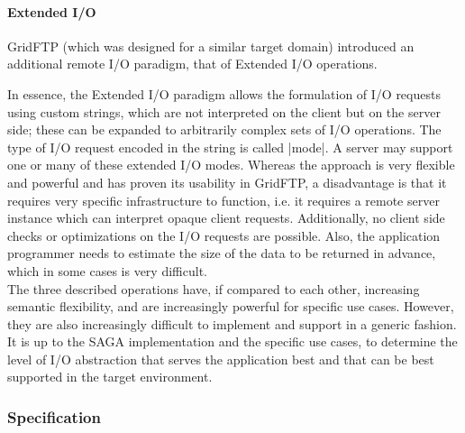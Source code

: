  
   \paragraph{Extended I/O}
   
   GridFTP (which was designed for a similar target domain)
   introduced an additional remote I/O paradigm, that of
   Extended I/O operations.
   
   In essence, the Extended I/O paradigm allows the formulation
   of I/O requests using custom strings, which are not
   interpreted on the client but on the server side; these can
   be expanded to arbitrarily complex sets of I/O
   operations.  The type of I/O request encoded in the string is
   called |mode|.  A server may support one or many of these
   extended I/O modes.  Whereas the approach is very flexible
   and powerful and has proven its usability in GridFTP, a
   disadvantage is that it requires very specific infrastructure
   to function, i.e. it requires a remote server instance which
   can interpret opaque client requests.  Additionally, no
   client side checks or optimizations on the I/O requests are
   possible.  Also, the application programmer needs to estimate
   the size of the data to be returned in advance, which in some
   cases is very difficult.\\
   
   The three described operations have, if compared to each
   other, increasing semantic flexibility, and are increasingly
   powerful for specific use cases.  However, they are also
   increasingly difficult to implement and support in a generic
   fashion.  It is up to the SAGA implementation and the
   specific use cases, to determine the level of I/O abstraction
   that serves the application best and that can be best
   supported in the target environment.
 
 
 \subsubsection{Specification}
 
